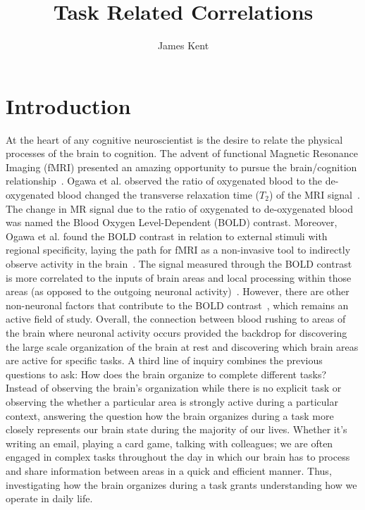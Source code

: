 \documentclass[phd,appendix,figures]{uithesis}
\title{Task Related Correlations}
\author{James Kent}
\begin{document}
\frontmatter
\chapter{Introduction}

At the heart of any cognitive neuroscientist is the desire to relate the physical
processes of the brain to cognition.
The advent of functional Magnetic Resonance Imaging (fMRI) presented an amazing opportunity
to pursue the brain/cognition relationship~\cite{ogawa1990,Ogawa1992}.
Ogawa et al. observed the ratio of oxygenated blood to the de-oxygenated blood changed the transverse
relaxation time ($T_2$) of the MRI signal~\cite{ogawa1990}.
The change in MR signal due to the ratio of oxygenated to de-oxygenated blood was named the
Blood Oxygen Level-Dependent (BOLD) contrast. 
Moreover, Ogawa et al. found the BOLD contrast in
relation to external stimuli with regional specificity, laying the path for fMRI as a non-invasive tool
to indirectly observe activity in the brain~\cite{Ogawa1992}.
The signal measured through the BOLD contrast is more correlated to the inputs of brain
areas and local processing within those areas (as opposed to the outgoing neuronal activity)~\cite{Logothetis2001}.
However, there are other non-neuronal factors that contribute to the BOLD contrast~\cite{Kim2012}, which
remains an active field of study.
Overall, the connection between blood rushing to areas of the brain where 
neuronal activity occurs provided the backdrop for discovering the large scale organization
of the brain at rest and discovering which brain areas are active for specific tasks.
A third line of inquiry combines the previous questions to ask: How does the brain
organize to complete different tasks?
Instead of observing the brain's organization while there is no explicit task or observing
the whether a particular area is strongly active during a particular context,
answering the question how the brain organizes during a task more closely represents our brain state
during the majority of our lives.
Whether it's writing an email, playing a card game, talking with colleagues; we are
often engaged in complex tasks throughout the day in which our brain has to process
and share information between areas in a quick and efficient manner.
Thus, investigating how the brain organizes during a task grants understanding how
we operate in daily life.
\end{document}
